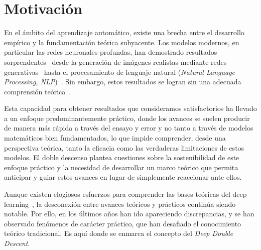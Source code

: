 \section{Motivación}

En el ámbito del aprendizaje automático, existe una brecha entre el desarrollo empírico y la fundamentación teórica subyacente. Los modelos modernos, en particular las redes neuronales profundas, han demostrado resultados sorprendentes~\cite{Sejnowski2020TheUE, He2020RecentAI} desde la generación de imágenes realistas mediante redes generativas~\cite{Elasri2022, Ruthotto2021} hasta el procesamiento de lenguaje natural (\textit{Natural Language Processing, NLP})~\cite{Kamath2019, Lauriola2022}. Sin embargo, estos resultados se logran sin una adecuada comprensión teórica~\cite{Ben-David2009, Grohs2022}.\newline

Esta capacidad para obtener resultados que consideramos satisfactorios ha llevado a un enfoque predominantemente práctico, donde los avances se suelen producir de manera más rápida a través del ensayo y error y no tanto a través de modelos matemáticos bien fundamentados, lo que impide comprender, desde una perspectiva teórica, tanto la eficacia como las verdaderas limitaciones de estos modelos. El doble descenso plantea cuestiones sobre la sostenibilidad de este enfoque práctico y la necesidad de desarrollar un marco teórico que permita anticipar y guiar estos avances en lugar de simplemente reaccionar ante ellos.\newline

Aunque existen elogiosos esfuerzos para comprender las bases teóricas del deep learning~\cite{Zhang2021,Mallat2016, Prince2023, Bishop2023, Grohs2022, Balestriero2018, Michael2018}, la desconexión entre avances teóricos y prácticos continúa siendo notable. Por ello, en los últimos años han ido apareciendo discrepancias, y se han observado fenómenos de carácter práctico, que han desafiado el conocimiento teórico tradicional. Es aquí donde se enmarca el concepto del \emph{Deep Double Descent}.\newline

